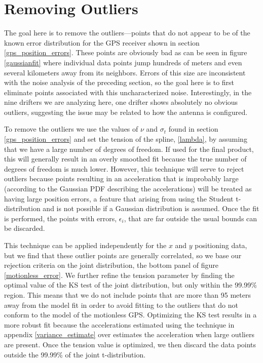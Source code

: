 \documentclass[10pt,journal]{IEEEtran}
\begin{document}
\section{Removing Outliers}
\label{sec:outliers}

The goal here is to remove the outliers---points that do not appear to be of the known error distribution for the GPS receiver shown in section \ref{gps_position_errors}. These points are obviously bad as can be seen in figure \ref{gaussianfit} where individual data points jump hundreds of meters and even several kilometers away from its neighbors. Errors of this size are inconsistent with the noise analysis of the preceding section, so the goal here is to first eliminate points associated with this uncharacterized noise. Interestingly, in the nine drifters we are analyzing here, one drifter shows absolutely no obvious outliers, suggesting the issue may be related to how the antenna is configured.

To remove the outliers we use the values of $\nu$ and $\sigma_t$ found in section \ref{gps_position_errors} and set the tension of the spline, \ref{lambda}, by assuming that we have a large number of degrees of freedom. If used for the final product, this will generally result in an overly smoothed fit because the true number of degrees of freedom is much lower. However, this technique will serve to reject outliers because points resulting in an acceleration that is improbably large (according to the Gaussian PDF describing the accelerations) will be treated as having large position errors, a feature that arising from using the Student t-distribution and is not possible if a Gaussian distribution is assumed. Once the fit is performed, the points with errors, $\epsilon_i$, that are far outside the usual bounds can be discarded. 

This technique can be applied independently for the $x$ and $y$ positioning data, but we find that these outlier points are generally correlated, so we base our rejection criteria on the joint distribution, the bottom panel of figure \ref{motionless_error}. We further refine the tension parameter by finding the optimal value of the KS test of the joint distribution, but only within the 99.99\% region. This means that we do not include points that are more than 95 meters away from the model fit in order to avoid fitting to the outliers that do not conform to the model of the motionless GPS. Optimizing the KS test results in a more robust fit because the accelerations estimated using the technique in appendix \ref{variance_estimate} over estimates the acceleration when large outliers are present. Once the tension value is optimized, we then discard the data points outside the 99.99\% of the joint t-distribution.
\end{document}
